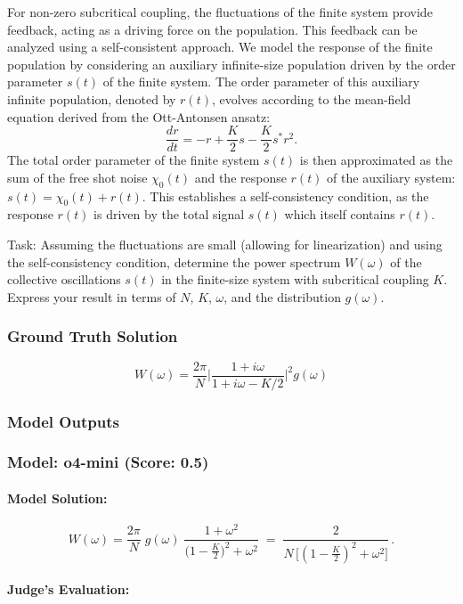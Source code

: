 \documentclass[10pt]{article}
\begin{document}
For non-zero subcritical coupling, the fluctuations of the finite system provide feedback, acting as a driving force on the population. This feedback can be analyzed using a self-consistent approach. We model the response of the finite population by considering an auxiliary infinite-size population driven by the order parameter $s(t)$ of the finite system. The order parameter of this auxiliary infinite population, denoted by $r(t)$, evolves according to the mean-field equation derived from the Ott-Antonsen ansatz:
$$ \frac{dr}{dt} = -r + \frac{K}{2}s - \frac{K}{2}s^* r^2. $$
The total order parameter of the finite system $s(t)$ is then approximated as the sum of the free shot noise $\chi_0(t)$ and the response $r(t)$ of the auxiliary system: $s(t) = \chi_0(t) + r(t)$. This establishes a self-consistency condition, as the response $r(t)$ is driven by the total signal $s(t)$ which itself contains $r(t)$.

Task:
Assuming the fluctuations are small (allowing for linearization) and using the self-consistency condition, determine the power spectrum $W(\omega)$ of the collective oscillations $s(t)$ in the finite-size system with subcritical coupling $K$. Express your result in terms of $N$, $K$, $\omega$, and the distribution $g(\omega)$.

\subsubsection*{Ground Truth Solution}
\[ \boxed{W(\omega)=\frac{2\pi}{N}\bigg|\frac{1+i\omega}{1+i\omega-K/2}\bigg|^2 g(\omega)} \]

\subsubsection*{Model Outputs}
\subsubsection*{Model: o4-mini (Score: 0.5)}
\paragraph*{Model Solution:}
\[ %
W(\omega)
=\frac{2\pi}{N}\;g(\omega)\;\frac{1+\omega^2}{\bigl(1-\tfrac K2\bigr)^2+\omega^2}
\;=\;
\frac{2}{N\,\bigl[(1-\tfrac K2)^2+\omega^2\bigr]}\,. \]

\paragraph*{Judge's Evaluation:}
\end{document}
